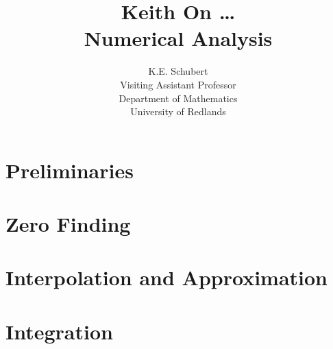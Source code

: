 \newcommand{\no}{\noindent}  
\newcommand{\ba}{\left[ \begin{array}}  
\newcommand{\ea}{\\ \end{array} \right]}  
\newcommand{\bb}{\cite} 
\newcommand{\VE}[1]{\in {\bf R}^{{#1}}} 
\newcommand{\EP}[2]{\in {\bf R}^{{#1} \times {#2}}}
\newcommand{\diago}{\mbox{\rm diag}}
\newcommand{\gammaopt}{\gamma_{opt}}
\newcommand{\xopt}{x_{opt}}
\newcommand{\xgam}{x(\gamma)}
\newtheorem{problem}{Problem}
\newlength{\lll}

\title{
  {\Huge
  Keith On \ldots \\
  \huge
  Numerical Analysis
  \normalsize}
}
\author{
  K.E. Schubert \\
  Visiting Assistant Professor \\
  Department of Mathematics \\
  University of Redlands
}
\date{}



\newtheorem{definition}{Definition}[chapter]
\newtheorem{theorem}[definition]{Theorem}
\newtheorem{lemma}[definition]{Lemma}
\newtheorem{corollary}[definition]{Corollary}
\normalbaselineskip

\maketitle
\tableofcontents
\listoffigures
\listoftables
\newpage



\chapter{Preliminaries}\label{c-Prelim}
%
\newpage
\chapter{Zero Finding}\label{c-zero}

\newpage
\chapter{Interpolation and Approximation}\label{c-IntApp}

\newpage
\chapter{Integration}\label{c-Integ}






